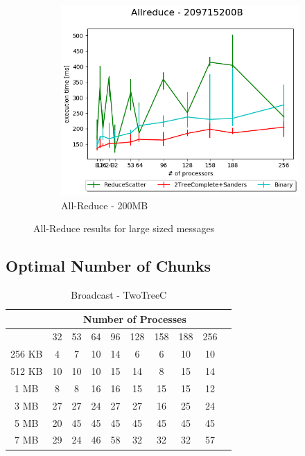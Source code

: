 \documentclass[sigplan,review,anonymous]{acmart}\settopmatter{printfolios=true,printccs=false,printacmref=false}
\begin{document}
\begin{figure}
\begin{subfigure}{0.5\textwidth}
  \centering
  \includegraphics[width=0.5\linewidth]{images/Results/AllReduce/AllReduceComp2_209715200B.png}
  \caption{All-Reduce - 200MB}
  \label{reduce-selected-7MB}
\end{subfigure}
\caption{All-Reduce results for large sized messages}
\label{graph-reduce-medium2-selected}
\end{figure}

\subsection{Optimal Number of Chunks}

\begin{table}[t]

\caption{Broadcast - TwoTreeC}
\begin{center}
\tablefont
\begin{tabular}{|c|c|c|c|c|c|c|c|c|c|}
\hline
& \multicolumn{8}{c|}{Number of Processes} \\
\hline
& 32 & 53 & 64 & 96 & 128 & 158 & 188 & 256\\
\hline
 256 KB & 4 & 7 & 10 & 14 & 6 & 6 & 10 & 10\\
 512 KB & 10 & 10 & 10 & 15 & 14 & 8 & 15 & 14\\
 1 MB & 8 & 8 & 16 & 16 & 15 & 15 & 15 & 12\\
 3 MB & 27 & 27 & 24 & 27 & 27 & 16 & 25 & 24\\
 5 MB & 20 & 45 & 45 & 45 & 45 & 45 & 45 & 45\\
 7 MB & 29 & 24 & 46 & 58 & 32 & 32 & 32 & 57\\
\hline
\end{tabular}
\end{center}
\end{table}
\end{document}
